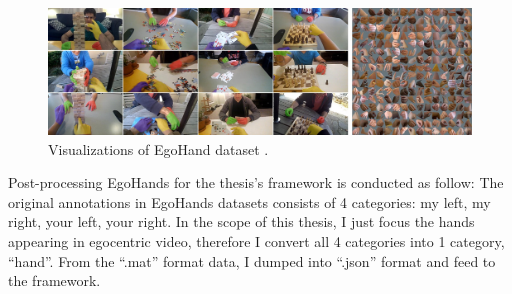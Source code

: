 \begin{figure}[!htb]
	\centerline{\includegraphics[width=1\linewidth]{Figs/egohands.jpg}}
	\caption{Visualizations of EgoHand dataset \cite{10.1109/ICCV.2015.226}.}
	\label{fig:egohands}
\end{figure}
Post-processing EgoHands for the thesis’s framework is conducted as follow: The original annotations in EgoHands datasets consists of 4 categories: my left, my right, your left, your right. In the scope of this thesis, I just focus the hands appearing in egocentric video, therefore I convert all 4 categories into 1 category, “hand”. From the “.mat” format data, I dumped into “.json” format and feed to the framework.
